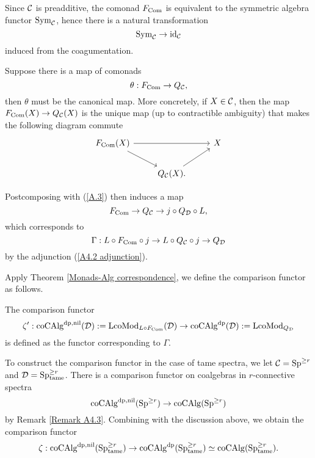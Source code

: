 Since ${\mathcal{C}}$ is preadditive, the comonad $F_{\operatorname{Com}}$ is equivalent to the symmetric algebra functor $\operatorname{Sym}_{{\mathcal{C}}}$, hence there is a natural transformation 
$$
\operatorname{Sym}_{{\mathcal{C}}} \to \operatorname{id}_{{\mathcal{C}}}
$$
induced from the coagumentation.

\begin{remark}
\label{F_Com to Q_C}
Suppose there is a map of comonads
$$
\theta: F_{\operatorname{Com}} \to 
Q_{{\mathcal{C}}},
$$
then $\theta$ must be the canonical map.
    More concretely, if $X\in {\mathcal{C}}$, then the map $F_{\operatorname{Com}}(X) \to 
Q_{{\mathcal{C}}}(X)$ is the unique map (up to contractible ambiguity) that makes the following diagram commute
\[
\begin{tikzcd}
	 F_{\Com}(X) &   & X \\
	& Q_{\CC}(X) .  &
	\arrow[from=1-1, to = 1-3]
	\arrow[from=1-1 , to =2-2]
	\arrow[from=2-2, to=1-3]
\end{tikzcd}
\]
\end{remark}


Postcomposing with (\ref{A.3}) then induces a map 
$$
F_{\operatorname{Com}}  \to 
Q_{{\mathcal{C}}}
\to 
j\circ Q_{{\mathcal{D}}} \circ L,
$$
which corresponds to 
$$
\Gamma: L\circ F_{\operatorname{Com}} \circ j \to L\circ Q_{{\mathcal{C}}} \circ j \to Q_{{\mathcal{D}}}
$$
by the adjunction (\ref{A4.2 adjunction}).

Apply Theorem \ref{Monads-Alg correspondence}, we define the comparison functor as follows.
\begin{definition}
    The comparison functor
    \[
    \zeta': \operatorname{coCAlg}^{\operatorname{dp},\operatorname{nil}}({\mathcal{D}}) :=\operatorname{LcoMod}_{L\circ F_{\operatorname{Com}}}({\mathcal{D}}) \to \operatorname{coCAlg}^{\operatorname{dp}}({\mathcal{D}}):=\operatorname{LcoMod}_{Q_{{\mathcal{D}}}}
    \]
    is defined as the functor corresponding to $\Gamma$.
\end{definition}

To construct the comparison functor in the case of tame spectra, we let ${\mathcal{C}}=\operatorname{Sp}^{\geq r}$ and ${\mathcal{D}}=\operatorname{Sp}^{\geq r}_{\operatorname{\operatorname{tame}}}$. There is a comparison functor on coalgebras in $r$-connective spectra
$$
\operatorname{coCAlg}^{\operatorname{dp}, \operatorname{nil}}(\operatorname{Sp}^{\geq r}) \to  \operatorname{coCAlg}(\operatorname{Sp}^{\geq r})
$$
by Remark \ref{Remark A4.3}.
Combining with the discussion above, we obtain the comparison functor
\[
\zeta:\operatorname{coCAlg}^{\operatorname{dp},\operatorname{nil}}(\operatorname{Sp}^{\geq r}_{\operatorname{\operatorname{tame}}}) \to
\operatorname{coCAlg}^{\operatorname{dp}}(\operatorname{Sp}^{\geq r}_{\operatorname{\operatorname{tame}}})\simeq
\operatorname{coCAlg}(\operatorname{Sp}^{\geq r}_{\operatorname{\operatorname{tame}}}).
\]




